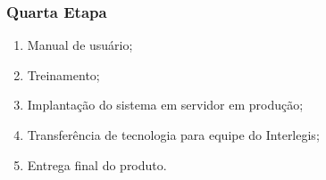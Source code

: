 \subsubsection{Quarta Etapa}
\begin{enumerate}
\item Manual de usuário;
\item Treinamento;
\item Implantação do sistema em servidor em produção;
\item Transferência de tecnologia para equipe do Interlegis;
\item Entrega final do produto.
\end{enumerate}

%
%
